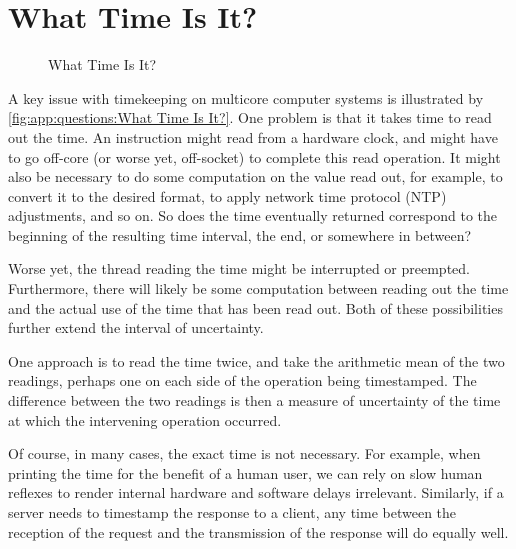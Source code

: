 
\section{What Time Is It?}
\label{sec:app:questions:What Time Is It?}

\begin{figure}[htb]
\centering
{}
\caption{What Time Is It?}
\end{figure}

A key issue with timekeeping on multicore computer systems is illustrated
by \cref{fig:app:questions:What Time Is It?}.
One problem is that it takes time to read out the time.
An instruction might read from a hardware clock, and might
have to go off-core (or worse yet, off-socket) to complete
this read operation.
It might also be necessary to do some computation on the value read out,
for example, to convert it to the desired format, to apply network time
protocol (NTP) adjustments, and so on.
So does the time eventually returned correspond to the beginning of
the resulting time interval, the end, or somewhere in between?

Worse yet, the thread reading the time might be interrupted or preempted.
Furthermore, there will likely be some computation between reading out
the time and the actual use of the time that has been read out.
Both of these possibilities further extend the interval of uncertainty.

One approach is to read the time twice, and take the arithmetic mean
of the two readings, perhaps one on each side of the operation being
timestamped.
The difference between the two readings is then a measure of uncertainty
of the time at which the intervening operation occurred.

Of course, in many cases, the exact time is not necessary.
For example, when printing the time for the benefit of a human user,
we can rely on slow human reflexes to render internal hardware and
software delays irrelevant.
Similarly, if a server needs to timestamp the response to a client, any
time between the reception of the request and the transmission of the
response will do equally well.






